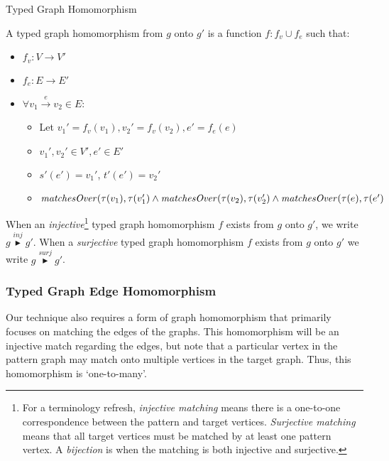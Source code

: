 \begin{definition}{Typed Graph Homomorphism\\}
\label{def:typed_graph_homomorphism}

A typed graph homomorphism from $g$ onto $g'$ is a function $f: f_v \cup f_e$ such that:
\begin{itemize}
\item $f_v: V\rightarrow V'$
\item $f_e: E\rightarrow E'$
\item $\forall v_1 \xrightarrow{e} v_2\in E$:
\begin{itemize}
\item Let $ v_1' = f_v(v_1), v_2' = f_v(v_2), e' = f_e(e)$
\item $v_1', v_2' \in V', e' \in E'$
\item $s'(e') = v_1'$, $t'(e') = v_2'$
\item $\mathit{matchesOver}(\tau(v_1), \tau(v_1') \land \\\mathit{matchesOver}(\tau(v_2), \tau(v_2') \land\\ \mathit{matchesOver}(\tau(e), \tau(e')$
\end{itemize}

\end{itemize}  
\end{definition}

 When an \emph{injective}\footnote{For a terminology refresh, \textit{injective matching} means there is a one-to-one correspondence between the pattern and target vertices. \textit{Surjective matching} means that all target vertices must be matched by at least one pattern vertex. A \textit{bijection} is when the matching is both injective and surjective.} typed graph homomorphism $f$ exists from $g$ onto $g'$, we write $g \stackrel{inj}{\blacktriangleright} g'$. When a \emph{surjective} typed graph homomorphism $f$ exists from $g$ onto $g'$ we write $g \stackrel{surj}{\blacktriangleright} g'$.

\subsubsection*{Typed Graph Edge Homomorphism}

Our technique also requires a form of graph homomorphism that primarily focuses on matching the edges of the graphs. This homomorphism will be an injective match regarding the edges, but note that a particular vertex in the pattern graph may match onto multiple vertices in the target graph. Thus, this homomorphism is `one-to-many'.

